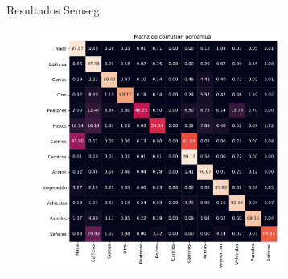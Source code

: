 \documentclass[10pt, usepdftitle=false]{beamer}
\begin{document}
\begin{frame}[fragile]{Resultados Semseg}
	\begin{figure}[H]
		\captionsetup{labelformat=empty}
		\centering
		\includegraphics[height=8cm]{imagenes/c_mat}
	\end{figure}
\end{frame}
\end{document}
